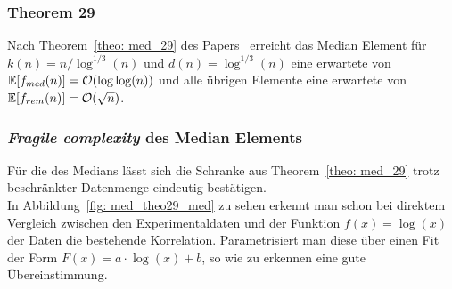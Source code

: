 \subsubsection{Theorem 29}		%

\noindent
Nach Theorem~\ref{theo: med_29} des Papers~\cite{meyer2} erreicht das Median Element für $k(n)=n / \log^{1/3}(n)$ und $d(n)=\log^{1/3}(n)$ eine erwartete \fg von $\mathbb{E}[f_{med}(n)]=\mathcal{O}(\log\log(n))$ und alle übrigen Elemente eine erwartete \fg von $\mathbb{E}[f_{rem}(n)]=\mathcal{O}(\sqrt{n})$.\\[.05cm]

\subsubsection*{\textit{Fragile complexity} des Median Elements}
Für die \fg des Medians \fgm lässt sich die Schranke aus Theorem~\ref{theo: med_29} trotz beschränkter Datenmenge eindeutig bestätigen.\\[.05cm]
In Abbildung~\ref{fig: med_theo29_med} zu sehen erkennt man schon bei direktem Vergleich zwischen den Experimentaldaten und der Funktion $f(x)=\log(x)$ der Daten die bestehende Korrelation. Parametrisiert man diese über einen Fit der Form $F(x)=a\cdot \log(x) + b$, so wie zu erkennen eine gute Übereinstimmung.


